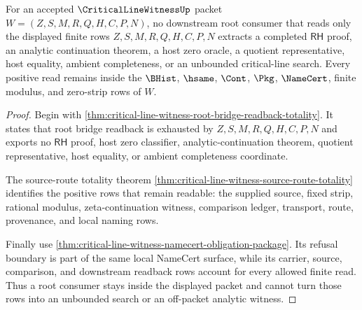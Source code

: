 \begin{theorem}
\label{thm:critical-line-witness-root-consumer-nonescape}
For an accepted $\CriticalLineWitnessUp$ packet $W=(Z,S,M,R,Q,H,C,P,N)$, no
downstream root consumer that reads only the displayed finite rows
$Z,S,M,R,Q,H,C,P,N$ extracts a completed $\mathsf{RH}$ proof, an analytic
continuation theorem, a host zero oracle, a quotient representative, host
equality, ambient completeness, or an unbounded critical-line search. Every
positive read remains inside the $\BHist$, $\hsame$, $\Cont$, $\Pkg$,
$\NameCert$, finite modulus, and zero-strip rows of $W$.
\end{theorem}
\begin{proof}
Begin with
\autoref{thm:critical-line-witness-root-bridge-readback-totality}. It states
that root bridge readback is exhausted by
$Z,S,M,R,Q,H,C,P,N$ and exports no $\mathsf{RH}$ proof, host zero classifier,
analytic-continuation theorem, quotient representative, host equality, or
ambient completeness coordinate.

The source-route totality theorem
\autoref{thm:critical-line-witness-source-route-totality} identifies the
positive rows that remain readable: the supplied source, fixed strip, rational
modulus, zeta-continuation witness, comparison ledger, transport, route,
provenance, and local naming rows.

Finally use
\autoref{thm:critical-line-witness-namecert-obligation-package}. Its refusal
boundary is part of the same local NameCert surface, while its carrier,
source, comparison, and downstream readback rows account for every allowed
finite read. Thus a root consumer stays inside the displayed packet and cannot
turn those rows into an unbounded search or an off-packet analytic witness.
\end{proof}
